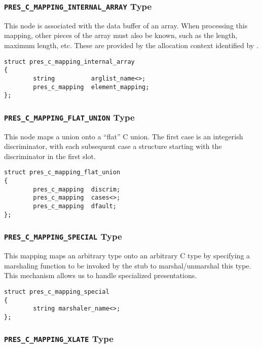 \subsubsection{\texttt{PRES\_C\_MAPPING\_INTERNAL\_ARRAY} Type}

This node is associated with the data buffer of an array.  When processing this
mapping, other pieces of the array must also be known, such as the length,
maximum length, etc.  These are provided by the allocation context identified
by .

\begin{verbatim}
struct pres_c_mapping_internal_array
{
        string          arglist_name<>;
        pres_c_mapping  element_mapping;
};
\end{verbatim}

\subsubsection{\texttt{PRES\_C\_MAPPING\_FLAT\_UNION} Type}

This node maps a \MINT{} union onto a ``flat'' C union.  The first case is an
integerish discriminator, with each subsequent case a structure starting with
the discriminator in the first slot.

\begin{verbatim}
struct pres_c_mapping_flat_union
{
        pres_c_mapping  discrim;
        pres_c_mapping  cases<>;
        pres_c_mapping  dfault;
};
\end{verbatim}

\subsubsection{\texttt{PRES\_C\_MAPPING\_SPECIAL} Type}

This mapping maps an arbitrary \MINT{} type onto an arbitrary C type by
specifying a marshaling function to be invoked by the stub to marshal/unmarshal
this \MINT{} type.  This mechanism allows us to handle specialized
presentations.

\begin{verbatim}
struct pres_c_mapping_special
{
        string marshaler_name<>;
};
\end{verbatim}

\subsubsection{\texttt{PRES\_C\_MAPPING\_XLATE} Type}

